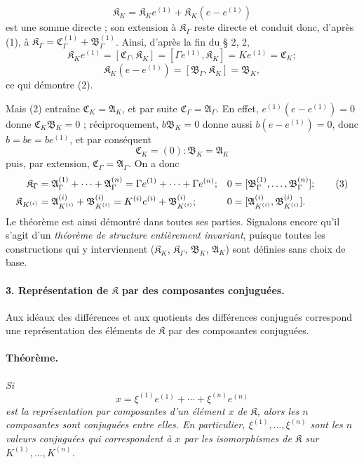 \[
\mathfrak K_K=\mathfrak K_K e^{(1)}+\mathfrak K_K(e-e^{(1)})
\]
est une somme directe ; son extension à $\mathfrak K_\Gamma$ reste directe et conduit donc, d'après (1), à $\mathfrak K_\Gamma=\mathfrak C_\Gamma^{(1)}+\mathfrak B_\Gamma^{(1)}$. Ainsi, d'après la fin du \S{} 2, 2,
\[
\mathfrak K_K e^{(1)}=[\mathfrak C_\Gamma,\mathfrak K_K]
=[\Gamma e^{(1)},\mathfrak K_K]=Ke^{(1)}=\mathfrak C_K;
\]
\[
\mathfrak K_K(e-e^{(1)})=[\mathfrak B_\Gamma,\mathfrak K_K]=\mathfrak B_K,
\]
ce qui démontre (2).

Mais (2) entraîne $\mathfrak C_K=\mathfrak A_K$, et par suite $\mathfrak C_\Gamma=\mathfrak A_\Gamma$. En effet, $e^{(1)}(e-e^{(1)})=0$ donne $\mathfrak C_K\mathfrak B_K=0$ ; réciproquement, $b\mathfrak B_K=0$ donne aussi $b(e-e^{(1)})=0$, donc $b=be=be^{(1)}$, et par conséquent
\[
\mathfrak C_K=(0):\mathfrak B_K=\mathfrak A_K
\]
puis, par extension, $\mathfrak C_\Gamma=\mathfrak A_\Gamma$. On a donc
\begin{align}
\mathfrak K_\Gamma
&=\mathfrak A_\Gamma^{(1)}+\cdots+\mathfrak A_\Gamma^{(n)}
=\Gamma e^{(1)}+\cdots+\Gamma e^{(n)};
&0&=[\mathfrak B_\Gamma^{(1)},\ldots,\mathfrak B_\Gamma^{(n)}]; \tag{3}\\
\mathfrak K_{K^{(i)}}
&=\mathfrak A_{K^{(i)}}^{(i)}+\mathfrak B_{K^{(i)}}^{(i)}
=K^{(i)}e^{(i)}+\mathfrak B_{K^{(i)}}^{(i)};
&0&=[\mathfrak A_{K^{(i)}}^{(i)},\mathfrak B_{K^{(i)}}^{(i)}].\notag
\end{align}
Le théorème est ainsi démontré dans toutes ses parties. Signalons encore qu'il s'agit d'un \emph{théorème de structure entièrement invariant}, puisque toutes les constructions qui y interviennent ($\mathfrak K_K$, $\mathfrak K_\Gamma$, $\mathfrak B_K$, $\mathfrak A_K$) sont définies sans choix de base.

\paragraph{3. Représentation de $\mathfrak K$ par des composantes conjuguées.}
Aux idéaux des différences et aux quotients des différences conjugués correspond une représentation des éléments de $\mathfrak K$ par des composantes conjuguées.

\paragraph{Théorème.}
\emph{Si
\[
x=\xi^{(1)}e^{(1)}+\cdots+\xi^{(n)}e^{(n)}
\]
est la représentation par composantes d'un élément $x$ de $\mathfrak K$, alors les $n$ composantes sont conjuguées entre elles. En particulier, $\xi^{(1)},\ldots,\xi^{(n)}$ sont les $n$ valeurs conjuguées qui correspondent à $x$ par les isomorphismes de $\mathfrak K$ sur $K^{(1)},\ldots,K^{(n)}$.}

